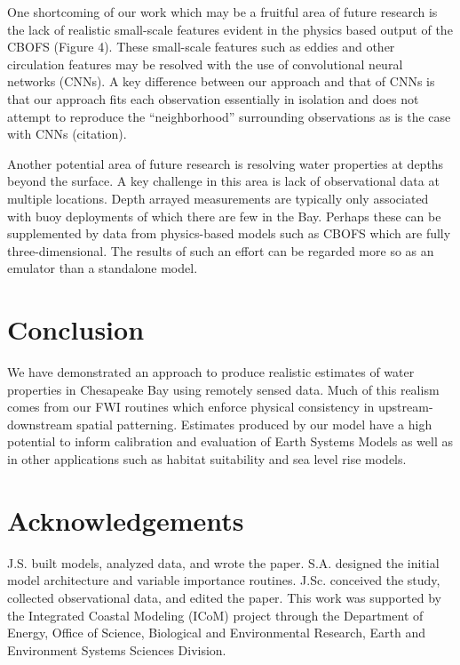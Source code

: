 \documentclass{article}
\begin{document}
One shortcoming of our work which may be a fruitful area of future research is the lack of realistic small-scale features evident in the physics based output of the CBOFS (Figure 4). These small-scale features such as eddies and other circulation features may be resolved with the use of convolutional neural networks (CNNs). A key difference between our approach and that of CNNs is that our approach fits each observation essentially in isolation and does not attempt to reproduce the “neighborhood” surrounding observations as is the case with CNNs (citation). 

Another potential area of future research is resolving water properties at depths beyond the surface. A key challenge in this area is lack of observational data at multiple locations. Depth arrayed measurements are typically only associated with buoy deployments of which there are few in the Bay. Perhaps these can be supplemented by data from physics-based models such as CBOFS which are fully three-dimensional. The results of such an effort can be regarded more so as an emulator than a standalone model.

\section{Conclusion}

We have demonstrated an approach to produce realistic estimates of water properties in Chesapeake Bay using remotely sensed data. Much of this realism comes from our FWI routines which enforce physical consistency in upstream-downstream spatial patterning. Estimates produced by our model have a high potential to inform calibration and evaluation of Earth Systems Models as well as in other applications such as habitat suitability and sea level rise models.

\FloatBarrier

\section{Acknowledgements}

J.S. built models, analyzed data, and wrote the paper. S.A. designed the initial model architecture and variable importance routines. J.Sc. conceived the study, collected observational data, and edited the paper. This work was supported by the Integrated Coastal Modeling (ICoM) project through the Department of Energy, Office of Science,
Biological and Environmental Research, Earth and Environment Systems Sciences Division. 



\end{document}
